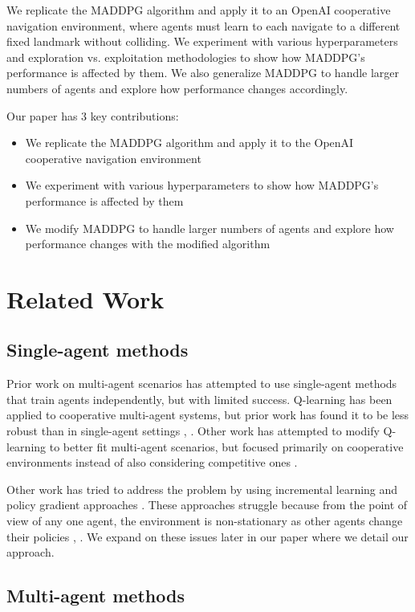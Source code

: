 \documentclass{article}
\begin{document}
We replicate the MADDPG algorithm and apply it to an OpenAI cooperative navigation environment, where agents must learn to each navigate to a different fixed landmark without colliding. We experiment with various hyperparameters and exploration vs. exploitation methodologies to show how MADDPG's performance is affected by them. We also generalize MADDPG to handle larger numbers of agents and explore how performance changes accordingly.

Our paper has 3 key contributions:
\begin{itemize}[nosep]
\item We replicate the MADDPG algorithm and apply it to the OpenAI cooperative navigation environment
\item We experiment with various hyperparameters to show how MADDPG's performance is affected by them
\item We modify MADDPG to handle larger numbers of agents and explore how performance changes with the modified algorithm
\end{itemize}

\section{Related Work}
\subsection{Single-agent methods}
Prior work on multi-agent scenarios has attempted to use single-agent methods that train agents independently, but with limited success. Q-learning has been applied to cooperative multi-agent systems, but prior work has found it to be less robust than in single-agent settings \cite{sandholm1996}, \cite{claus1998dynamics}. Other work has attempted to modify Q-learning to better fit multi-agent scenarios, but focused primarily on cooperative environments instead of also considering competitive ones \cite{cooperativeQ}.

Other work has tried to address the problem by using incremental learning and policy gradient approaches \cite{buffet2007}. These approaches struggle because from the point of view of any one agent, the environment is non-stationary as other agents change their policies \cite{busoniu2008comprehensive}, \cite{bucsoniu2010multi}. We expand on these issues later in our paper where we detail our approach.

\subsection{Multi-agent methods}
\end{document}
